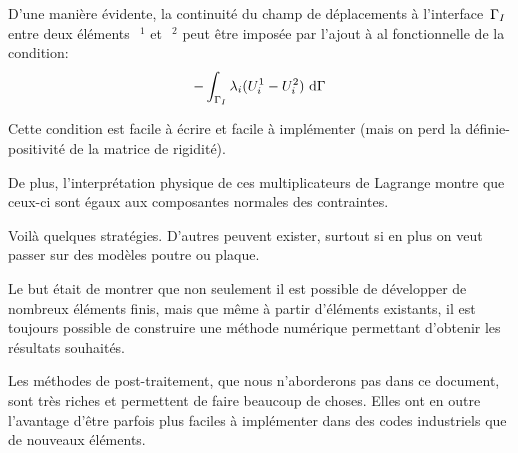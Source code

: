 \begin{description}
	D'une manière évidente, la continuité du champ de déplacements
	à l'interface~$\Gamma_I$ entre deux éléments~$~^1$ et~$~^2$ peut être
	imposée par l'ajout à al fonctionnelle de la condition:
	\begin{equation} -\dint_{\li} \lambda_i(U_i^1-U_i^2)\ \dd\Gamma \end{equation}

	Cette condition est facile à écrire et facile à implémenter (mais on perd la
	définie-positivité de la matrice de rigidité).
	
	De plus, l'interprétation physique de ces multiplicateurs de Lagrange montre
	que ceux-ci sont égaux aux composantes normales des contraintes.
\end{description}
\medskip
Voilà quelques stratégies. D'autres peuvent exister, surtout si en plus on veut passer
sur des modèles poutre ou plaque.

Le but était de montrer que non seulement il est possible de développer de nombreux
éléments finis, mais que même à partir d'éléments existants, il est toujours
possible de construire une méthode numérique permettant d'obtenir les résultats
souhaités.

Les méthodes de post-traitement, que nous n'aborderons pas dans ce document,
sont très riches et permettent de faire beaucoup de choses.
Elles ont en outre l'avantage d'être parfois plus faciles à implémenter dans des
codes industriels que de nouveaux éléments.

\medskip
